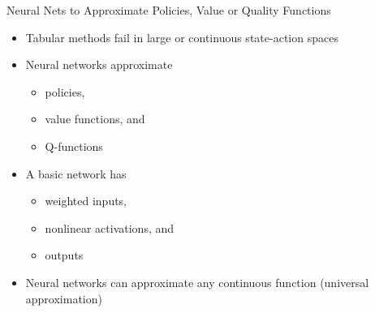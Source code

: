 \documentclass[11pt,table]{beamer}
\begin{document}
\begin{frame}{Neural Nets to Approximate Policies, Value or Quality Functions}
\begin{itemize}
    \item Tabular methods fail in large or continuous state-action spaces\\[2ex]
    \item Neural networks approximate
		
		\begin{itemize}
			\item policies, 
			\item value functions, and
			\item Q-functions\\[2ex]
		\end{itemize}
		
    \item A basic network has 
		
		\begin{itemize}
			\item weighted inputs,
			\item nonlinear activations, and
			\item outputs\\[2ex]
		\end{itemize}
		
    \item Neural networks can approximate any continuous function (universal approximation)
\end{itemize}
\end{frame}
\end{document}
